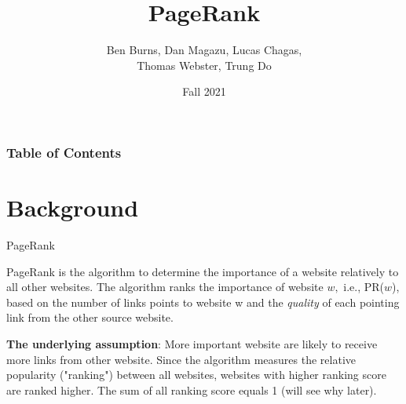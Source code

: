 \documentclass{beamer}
\title{PageRank}
\author{Ben Burns, Dan Magazu, Lucas Chagas, \\Thomas Webster, Trung Do}
\date{Fall 2021}
\begin{document}
\frame{\titlepage}

\begin{frame}
\frametitle{Table of Contents}
\tableofcontents
\end{frame}

\section{Background}
\begin{frame}[t]{PageRank}
\begin{outline}
    \1 PageRank is the algorithm to determine the importance of a website relatively to all other websites. The algorithm ranks the importance of website $w,$ i.e., PR($w$), based on the number of links points to website w and the \emph{quality} of each pointing link from the other source website. 

    \1 \textbf{The underlying assumption}: More important website are likely to receive more links from other website. Since the algorithm measures the relative popularity ("ranking") between all websites, websites with higher ranking score are ranked higher. The sum of all ranking score equals 1 (will see why later).
\end{outline}
\end{frame}
\end{document}
